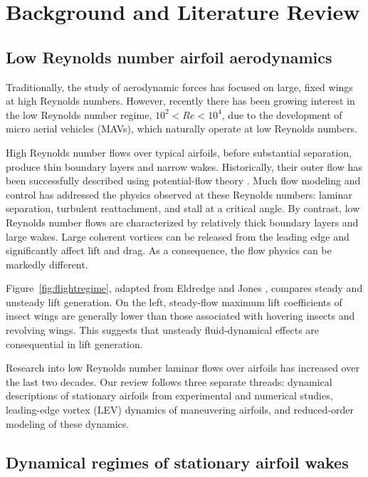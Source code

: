 \section{Background and Literature Review}
\subsection{Low Reynolds number airfoil aerodynamics}
Traditionally, the study of aerodynamic forces has focused on large, fixed wings at high Reynolds numbers. However, recently there has been growing interest in the low Reynolds number regime, $10^2<Re<10^4$, due to the development of micro aerial vehicles (MAVs), which naturally operate at low Reynolds numbers.

High Reynolds number flows over typical airfoils, before substantial separation, produce thin boundary layers and narrow wakes. Historically, their outer flow has been successfully described using potential-flow theory \cite{katz}. Much flow modeling and control has addressed the physics observed at these Reynolds numbers: laminar separation, turbulent reattachment, and stall at a critical angle. By contrast, low Reynolds number flows are characterized by relatively thick boundary layers and large wakes. Large coherent vortices can be released from the leading edge and significantly affect lift and drag. As a consequence, the flow physics can be markedly different.


Figure~\ref{fig:flightregime}, adapted from Eldredge and Jones \cite{eldredge2019}, compares steady and unsteady lift generation. On the left, steady-flow maximum lift coefficients of insect wings are generally lower than those associated with hovering insects and revolving wings. This suggests that unsteady fluid-dynamical effects are consequential in lift generation.

Research into low Reynolds number laminar flows over airfoils has increased over the last two decades. Our review follows three separate threads: dynamical descriptions of stationary airfoils from experimental and numerical studies, leading-edge vortex (LEV) dynamics of maneuvering airfoils, and reduced-order modeling of these dynamics.

\subsection{Dynamical regimes of stationary airfoil wakes}
